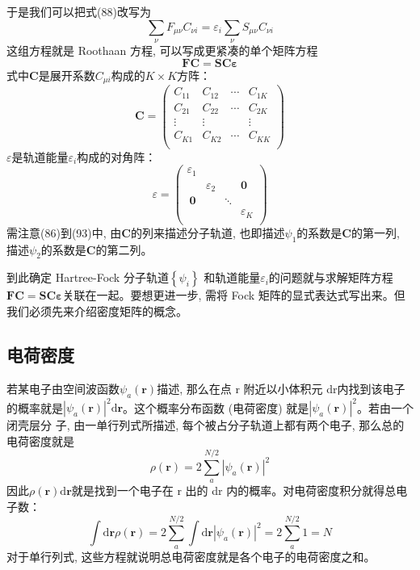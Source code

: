 \documentclass[]{article}
\begin{document}
于是我们可以把式(88)改写为
\begin{equation}
	\sum\limits_{\nu}F_{\mu\nu}C_{\nu i}=\varepsilon_i\sum\limits_{\nu}S_{\mu\nu}C_{\nu i}
\end{equation}
这组方程就是 Roothaan 方程, 可以写成更紧凑的单个矩阵方程
\begin{equation}
	\mathbf{FC}=\mathbf{SC\varepsilon}
\end{equation}
式中$\mathbf{C}$是展开系数$C_{\mu i}$构成的$K\times K$方阵：
\begin{equation}
	\mathbf{C}=\begin{pmatrix}
		C_{11}&C_{12}&\cdots&C_{1K}\\
		C_{21}&C_{22}&\cdots&C_{2K}\\
		\vdots&\vdots&      &\vdots\\
		C_{K1}&C_{K2}&\cdots&C_{KK}\\
	\end{pmatrix}
\end{equation}
$\varepsilon$是轨道能量$\varepsilon_i$构成的对角阵：
\begin{equation}
	\varepsilon=\begin{pmatrix}
		\varepsilon_1&             &      &         \\
		             &\varepsilon_2&      &\mathbf{0}\\
		\ \mathbf{0}   &             &\ddots&           \\
		             &             &      &\varepsilon_K\\
	\end{pmatrix}
\end{equation}
需注意(86)到(93)中, 由$\mathbf{C}$的列来描述分子轨道, 也即描述$\psi_1$的系数是$\mathbf{C}$的第一列, 描述$\psi_2$的系数是$\mathbf{C}$的第二列。

到此确定 Hartree-Fock 分子轨道$\left\lbrace\psi_i\right\rbrace $ 和轨道能量$\varepsilon_i$的问题就与求解矩阵方程
$\mathbf{FC}=\mathbf{SC\varepsilon}$关联在一起。要想更进一步, 需将 Fock 矩阵的显式表达式写出来。但我们必须先来介绍密度矩阵的概念。
\subsection{电荷密度}
若某电子由空间波函数$\psi_a(\mathbf{r})$描述, 那么在点 r 附近以小体积元 dr内找到该电子的概率就是$|\psi_a(\mathbf{r})|^2\mathrm{d}\mathbf{r}$。这个概率分布函数 (电荷密度) 就是$|\psi_a(\mathbf{r})|^2$。若由一个闭壳层分
子, 由一单行列式所描述, 每个被占分子轨道上都有两个电子, 那么总的电荷密度就是
\begin{equation}
	\rho(\mathbf{r})=2\sum\limits_a^{N/2}|\psi_a(\mathbf{r})|^2
\end{equation}
因此$\rho(\mathbf{r})\mathrm{d}\mathbf{r}$就是找到一个电子在 r 出的 dr 内的概率。对电荷密度积分就得总电子数：
\begin{equation}
	\int\mathrm{d}\mathbf{r}\rho(\mathbf{r})=2\sum\limits_a^{N/2}\int\mathrm{d}\mathbf{r}|\psi_a(\mathbf{r})|^2=2\sum\limits_a^{N/2}1=N
\end{equation}
对于单行列式, 这些方程就说明总电荷密度就是各个电子的电荷密度之和。
\end{document}
